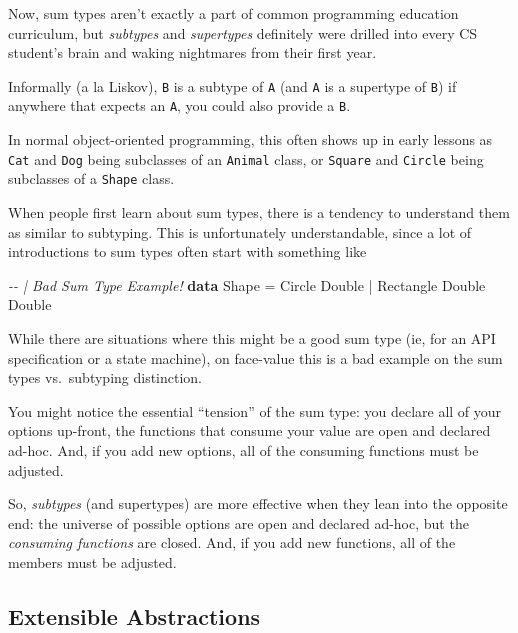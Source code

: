 \documentclass[]{article}
\newenvironment{Shaded}{}{}
\newcommand{\CommentTok}[1]{\textcolor[rgb]{0.38,0.63,0.69}{\textit{#1}}}
\newcommand{\DataTypeTok}[1]{\textcolor[rgb]{0.56,0.13,0.00}{#1}}
\newcommand{\KeywordTok}[1]{\textcolor[rgb]{0.00,0.44,0.13}{\textbf{#1}}}
\newcommand{\OperatorTok}[1]{\textcolor[rgb]{0.40,0.40,0.40}{#1}}
\newcommand{\OtherTok}[1]{\textcolor[rgb]{0.00,0.44,0.13}{#1}}
\begin{document}
Now, sum types aren't exactly a part of common programming education curriculum,
but \emph{subtypes} and \emph{supertypes} definitely were drilled into every CS
student's brain and waking nightmares from their first year.

Informally (a la Liskov), \texttt{B} is a subtype of \texttt{A} (and \texttt{A}
is a supertype of \texttt{B}) if anywhere that expects an \texttt{A}, you could
also provide a \texttt{B}.

In normal object-oriented programming, this often shows up in early lessons as
\texttt{Cat} and \texttt{Dog} being subclasses of an \texttt{Animal} class, or
\texttt{Square} and \texttt{Circle} being subclasses of a \texttt{Shape} class.

When people first learn about sum types, there is a tendency to understand them
as similar to subtyping. This is unfortunately understandable, since a lot of
introductions to sum types often start with something like

\begin{Shaded}
\begin{Highlighting}[]
\CommentTok{{-}{-} | Bad Sum Type Example!}
\KeywordTok{data} \DataTypeTok{Shape} \OtherTok{=} \DataTypeTok{Circle} \DataTypeTok{Double} \OperatorTok{|} \DataTypeTok{Rectangle} \DataTypeTok{Double} \DataTypeTok{Double}
\end{Highlighting}
\end{Shaded}

While there are situations where this might be a good sum type (ie, for an API
specification or a state machine), on face-value this is a bad example on the
sum types vs.~subtyping distinction.

You might notice the essential ``tension'' of the sum type: you declare all of
your options up-front, the functions that consume your value are open and
declared ad-hoc. And, if you add new options, all of the consuming functions
must be adjusted.

So, \emph{subtypes} (and supertypes) are more effective when they lean into the
opposite end: the universe of possible options are open and declared ad-hoc, but
the \emph{consuming functions} are closed. And, if you add new functions, all of
the members must be adjusted.

\subsection{Extensible Abstractions}\label{extensible-abstractions}
\end{document}
